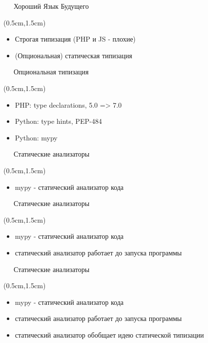 \documentclass[xetex,18pt,aspectratio=43]{beamer}
\begin{document}
\begin{Large}
\begin{frame}{\ \ \ Хороший Язык Будущего}
\begin{textblock*}{\framewidth-0.8cm}(0.5cm,1.5cm)
\begin{itemize}
  \item Строгая типизация (PHP и JS - плохие)
  \item (Опциональная) статическая типизация
\end{itemize}
\end{textblock*}
\end{frame}

\begin{frame}{\ \ \ Опциональная типизация}
\begin{textblock*}{\framewidth-0.8cm}(0.5cm,1.5cm)
\begin{itemize}
  \item PHP: type declarations, 5.0 => 7.0
  \item Python: type hints, PEP-484
  \item Python: mypy
\end{itemize}
\end{textblock*}
\end{frame}

\begin{frame}{\ \ \ Статические анализаторы}
\begin{textblock*}{\framewidth-0.8cm}(0.5cm,1.5cm)
\begin{itemize}
  \item mypy - статический анализатор кода
\end{itemize}
\end{textblock*}
\end{frame}

\begin{frame}{\ \ \ Статические анализаторы}
\begin{textblock*}{\framewidth-0.8cm}(0.5cm,1.5cm)
\begin{itemize}
  \item mypy - статический анализатор кода
  \item статический анализатор работает до запуска программы
\end{itemize}
\end{textblock*}
\end{frame}

\begin{frame}{\ \ \ Статические анализаторы}
\begin{textblock*}{\framewidth-0.8cm}(0.5cm,1.5cm)
\begin{itemize}
  \item mypy - статический анализатор кода
  \item статический анализатор работает до запуска программы
  \item статический анализатор обобщает идею статической типизации
\end{itemize}
\end{textblock*}
\end{frame}


\end{Large}
\end{document}
